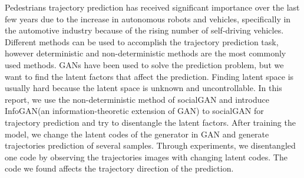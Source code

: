 Pedestrians trajectory prediction has received significant importance over the last few years due to the increase in autonomous robots and vehicles, specifically in the automotive industry because of the rising number of self-driving vehicles. Different methods can be used to accomplish the trajectory prediction task, however deterministic and non-deterministic methods are the most commonly used methods. GANs have been used to solve the prediction problem, but we want to find the latent factors that affect the prediction. Finding latent space is usually hard because the latent space is unknown and uncontrollable. In this report, we use the non-deterministic method of socialGAN and introduce  InfoGAN(an information-theoretic extension of GAN) to socialGAN for trajectory prediction and try to disentangle the latent factors. After training the model, we change the latent codes of the generator in GAN and generate trajectories prediction of several samples. Through experiments, we disentangled one code by observing the trajectories images with changing latent codes. The code we found affects the trajectory direction of the prediction.